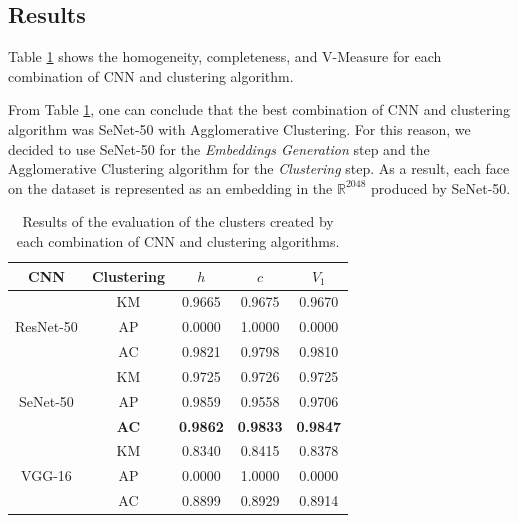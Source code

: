 \subsection{Results}
\label{subsec:results}

Table \ref{tab:results_clustering} shows the homogeneity, completeness, and V-Measure for each combination of CNN and clustering algorithm.

From Table \ref{tab:results_clustering}, one can conclude that the best combination of CNN and clustering algorithm was SeNet-50 with Agglomerative Clustering.
For this reason, we decided to use SeNet-50 for the \emph{Embeddings Generation} step and the Agglomerative Clustering algorithm for the \emph{Clustering} step.
As a result, each face on the dataset is represented as an embedding in the $\mathbb{R}^{2048}$ produced by SeNet-50.

\begin{table}[!ht]
\centering
\small
\caption{Results of the evaluation of the clusters created by each combination of CNN and clustering algorithms.}
\begin{tabular}{@{}ccccc@{}}
\toprule
\textbf{CNN} & \textbf{Clustering} & \textbf{$h$} & \textbf{$c$} & \textbf{$V_1$} \\ \midrule
                  & KM                  & 0.9665                     & 0.9675                      & 0.9670             \\
ResNet-50         & AP                  & 0.0000                     & 1.0000                      & 0.0000             \\
                  & AC                  & 0.9821                     & 0.9798                      & 0.9810             \\ \midrule
                  & KM                  & 0.9725                     & 0.9726                      & 0.9725             \\
SeNet-50          & AP                  & 0.9859                     & 0.9558                      & 0.9706             \\
                  & \textbf{AC}         & \textbf{0.9862}            & \textbf{0.9833}             & \textbf{0.9847}    \\ \midrule
                  & KM                  & 0.8340                     & 0.8415                      & 0.8378             \\
VGG-16            & AP                  & 0.0000                     & 1.0000                      & 0.0000             \\
                  & AC                  & 0.8899                     & 0.8929                      & 0.8914             \\
\end{tabular}
\label{tab:results_clustering}
\end{table}

